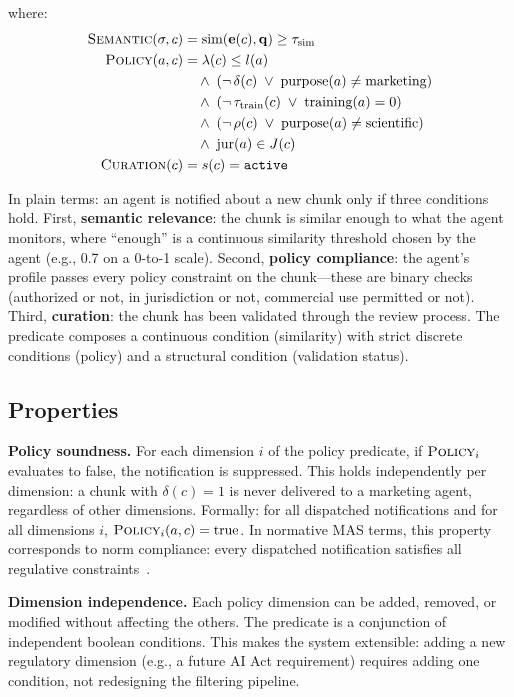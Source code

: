 \documentclass[11pt]{article}
\begin{document}
\noindent where:
\begin{align}
\textsc{Semantic}(\sigma, c) &= \text{sim}(\mathbf{e}(c), \mathbf{q}) \geq \tau_{\text{sim}} \\
\textsc{Policy}(a, c) &= \lambda(c) \leq l(a) \nonumber \\
  &\quad \wedge\; (\neg\,\delta(c) \;\vee\; \text{purpose}(a) \neq \text{marketing}) \nonumber \\
  &\quad \wedge\; (\neg\,\tau_{\text{train}}(c) \;\vee\; \text{training}(a) = 0) \nonumber \\
  &\quad \wedge\; (\neg\,\rho(c) \;\vee\; \text{purpose}(a) \neq \text{scientific}) \nonumber \\
  &\quad \wedge\; \text{jur}(a) \in J(c) \\
\textsc{Curation}(c) &= s(c) = \texttt{active}
\end{align}

In plain terms: an agent is notified about a new chunk only if three conditions hold. First, \textbf{semantic relevance}: the chunk is similar enough to what the agent monitors, where ``enough'' is a continuous similarity threshold chosen by the agent (e.g., 0.7 on a 0-to-1 scale). Second, \textbf{policy compliance}: the agent's profile passes every policy constraint on the chunk---these are binary checks (authorized or not, in jurisdiction or not, commercial use permitted or not). Third, \textbf{curation}: the chunk has been validated through the review process. The predicate composes a continuous condition (similarity) with strict discrete conditions (policy) and a structural condition (validation status).

\subsection{Properties}

\textbf{Policy soundness.} For each dimension $i$ of the policy predicate, if $\textsc{Policy}_i$ evaluates to false, the notification is suppressed. This holds independently per dimension: a chunk with $\delta(c) = 1$ is never delivered to a marketing agent, regardless of other dimensions. Formally: for all dispatched notifications and for all dimensions $i$, $\textsc{Policy}_i(a, c) = \text{true}$. In normative MAS terms, this property corresponds to norm compliance: every dispatched notification satisfies all regulative constraints~\cite{boella2004}.

\textbf{Dimension independence.} Each policy dimension can be added, removed, or modified without affecting the others. The predicate is a conjunction of independent boolean conditions. This makes the system extensible: adding a new regulatory dimension (e.g., a future AI Act requirement) requires adding one condition, not redesigning the filtering pipeline.
\end{document}
